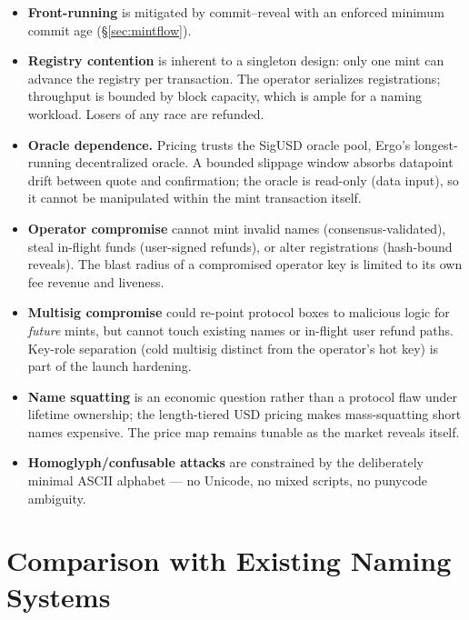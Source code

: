 \documentclass[11pt]{article}
\begin{document}
\begin{itemize}
  \item \textbf{Front-running} is mitigated by commit--reveal with an
        enforced minimum commit age (\S\ref{sec:mintflow}).
  \item \textbf{Registry contention} is inherent to a singleton design: only
        one mint can advance the registry per transaction. The operator
        serializes registrations; throughput is bounded by block capacity,
        which is ample for a naming workload. Losers of any race are
        refunded.
  \item \textbf{Oracle dependence.} Pricing trusts the SigUSD oracle pool,
        Ergo's longest-running decentralized oracle. A bounded slippage
        window absorbs datapoint drift between quote and confirmation; the
        oracle is read-only (data input), so it cannot be manipulated within
        the mint transaction itself.
  \item \textbf{Operator compromise} cannot mint invalid names
        (consensus-validated), steal in-flight funds (user-signed refunds),
        or alter registrations (hash-bound reveals). The blast radius of a
        compromised operator key is limited to its own fee revenue and
        liveness.
  \item \textbf{Multisig compromise} could re-point protocol boxes to
        malicious logic for \emph{future} mints, but cannot touch existing
        names or in-flight user refund paths. Key-role separation (cold
        multisig distinct from the operator's hot key) is part of the launch
        hardening.
  \item \textbf{Name squatting} is an economic question rather than a
        protocol flaw under lifetime ownership; the length-tiered USD pricing
        makes mass-squatting short names expensive. The price map remains
        tunable as the market reveals itself.
  \item \textbf{Homoglyph/confusable attacks} are constrained by the
        deliberately minimal ASCII alphabet --- no Unicode, no mixed scripts,
        no punycode ambiguity.
\end{itemize}

\section{Comparison with Existing Naming Systems}
\end{document}
